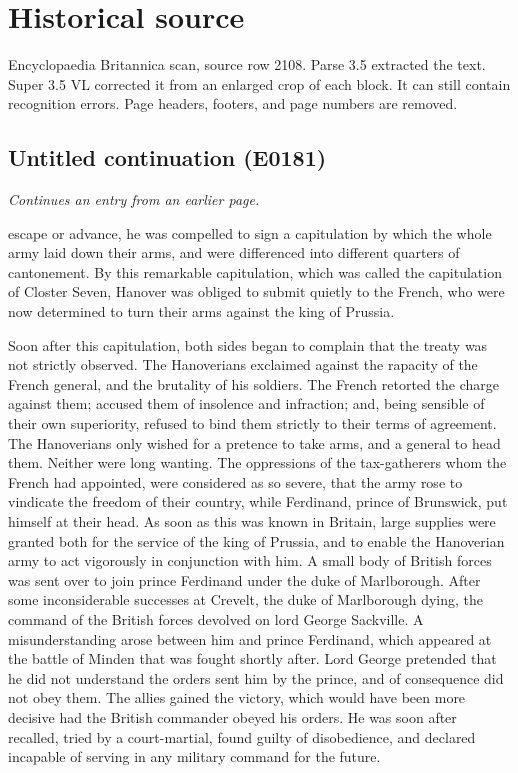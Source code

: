 \documentclass{article}
\begin{document}
\section*{Historical source}
Encyclopaedia Britannica scan, source row 2108. Parse 3.5 extracted the text. Super 3.5 VL corrected it from an enlarged crop of each block. It can still contain recognition errors.
Page headers, footers, and page numbers are removed.

\subsection*{Untitled continuation (E0181)}
\textit{Continues an entry from an earlier page.}

escape or advance, he was compelled to sign a capitulation by which the whole army laid down their arms, and were differenced into different quarters of cantonement. By this remarkable capitulation, which was called the capitulation of Closter Seven, Hanover was obliged to submit quietly to the French, who were now determined to turn their arms against the king of Prussia.

Soon after this capitulation, both sides began to complain that the treaty was not strictly observed. The Hanoverians exclaimed against the rapacity of the French general, and the brutality of his soldiers. The French retorted the charge against them; accused them of insolence and infraction; and, being sensible of their own superiority, refused to bind them strictly to their terms of agreement. The Hanoverians only wished for a pretence to take arms, and a general to head them. Neither were long wanting. The oppressions of the tax-gatherers whom the French had appointed, were considered as so severe, that the army rose to vindicate the freedom of their country, while Ferdinand, prince of Brunswick, put himself at their head. As soon as this was known in Britain, large supplies were granted both for the service of the king of Prussia, and to enable the Hanoverian army to act vigorously in conjunction with him. A small body of British forces was sent over to join prince Ferdinand under the duke of Marlborough. After some inconsiderable successes at Crevelt, the duke of Marlborough dying, the command of the British forces devolved on lord George Sackville. A misunderstanding arose between him and prince Ferdinand, which appeared at the battle of Minden that was fought shortly after. Lord George pretended that he did not understand the orders sent him by the prince, and of consequence did not obey them. The allies gained the victory, which would have been more decisive had the British commander obeyed his orders. He was soon after recalled, tried by a court-martial, found guilty of disobedience, and declared incapable of serving in any military command for the future.
\end{document}
